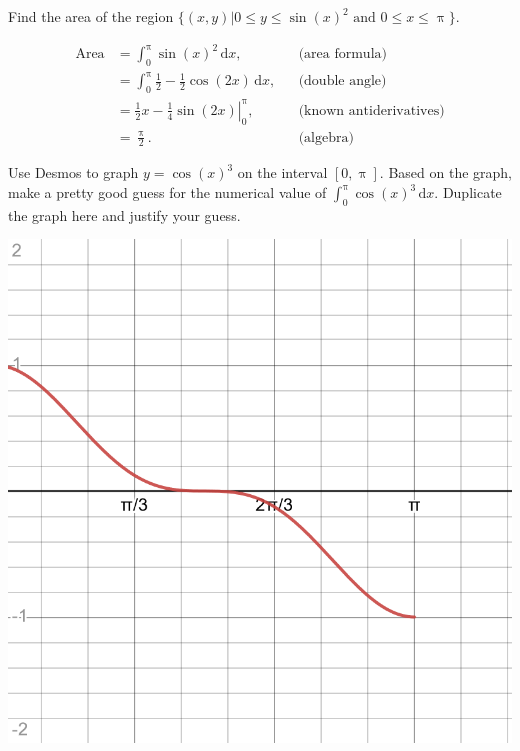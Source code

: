 \documentclass[12pt,fleqn,answers]{exam}
\begin{document}
\begin{questions} 

\question [2] Find the area of the region $\{(x,y) | 0 \leq y \leq \sin(x)^2 \mbox{ and } 0 \leq x \leq \uppi \}$.

\begin{solution}[2.5in]
    \begin{align*} \text{Area} &= \int_0^\uppi \sin(x)^2 \, \mathrm{d} x, && \text{(area formula)} \\
                               &= \int_0^\uppi \frac{1}{2} - \frac{1}{2} \cos(2 x) \, \mathrm{d} x, && \text{(double angle)} \\
                               &= \left. \frac{1}{2} x  - \frac{1}{4} \sin(2 x) \right |_{0}^\uppi, && \text{(known antiderivatives)}\\
                               &= \frac{\uppi}{2}. && \text{(algebra)}
    \end{align*}
\end{solution}


\question [2] Use Desmos to graph $y = \cos(x)^3$ on the interval $[0,\uppi]$. Based 
on the graph, make a pretty good guess for the numerical value of 
$\int_0^\uppi \cos(x)^3 \, \mathrm{d} x$. Duplicate the graph here 
and justify your guess.

\begin{solution}%

     \includegraphics[scale=0.15]{desmos-graph(19).png}


\end{solution}
\end{questions}
\end{document}
